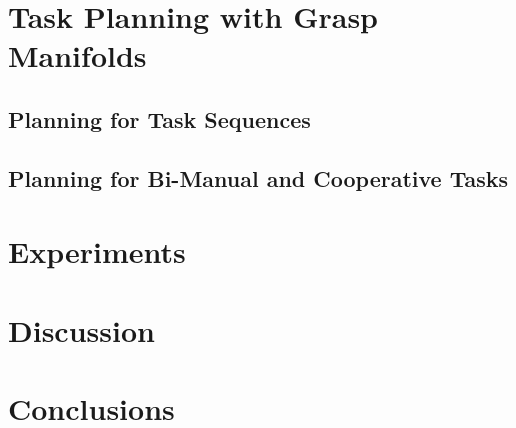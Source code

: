 \documentclass{aamas2015}
\begin{document}
%


\newpage
\section{Task Planning with Grasp Manifolds}

\newpage 
\subsection{Planning for Task Sequences}

\newpage
\subsection{Planning for Bi-Manual and Cooperative Tasks}

\newpage
\section{Experiments}
 
 \newpage
\section{Discussion}
\newpage
\section{Conclusions}
\end{document}
